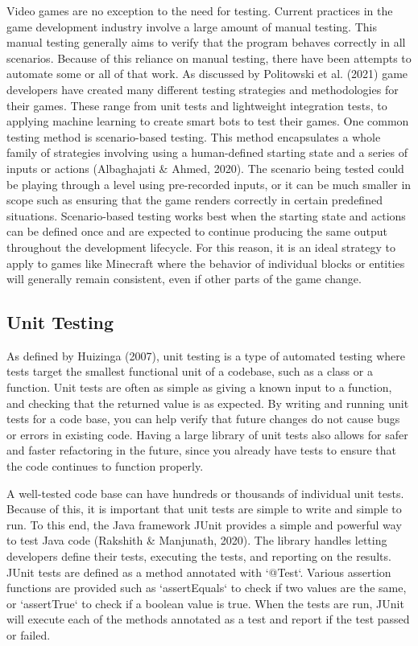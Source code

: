 \documentclass{article}
\begin{document}
\begin{onehalfspacing}
Video games are no exception to the need for testing. Current practices
in the game development industry involve a large amount of manual
testing. This manual testing generally aims to verify that the program
behaves correctly in all scenarios. Because of this reliance on manual
testing, there have been attempts to automate some or all of that work.
As discussed by Politowski et al. (2021) game developers have created
many different testing strategies and methodologies for their games.
These range from unit tests and lightweight integration tests, to
applying machine learning to create smart bots to test their games. One
common testing method is scenario-based testing. This method
encapsulates a whole family of strategies involving using a
human-defined starting state and a series of inputs or actions
(Albaghajati \& Ahmed, 2020). The scenario being tested could be playing
through a level using pre-recorded inputs, or it can be much smaller in
scope such as ensuring that the game renders correctly in certain
predefined situations. Scenario-based testing works best when the
starting state and actions can be defined once and are expected to
continue producing the same output throughout the development lifecycle.
For this reason, it is an ideal strategy to apply to games like
Minecraft where the behavior of individual blocks or entities will
generally remain consistent, even if other parts of the game change.

\subsection{Unit Testing}

As defined by Huizinga (2007), unit testing is a type of automated
testing where tests target the smallest functional unit of a codebase,
such as a class or a function. Unit tests are often as simple as giving
a known input to a function, and checking that the returned value is as
expected. By writing and running unit tests for a code base, you can
help verify that future changes do not cause bugs or errors in existing
code. Having a large library of unit tests also allows for safer and
faster refactoring in the future, since you already have tests to ensure
that the code continues to function properly.

A well-tested code base can have hundreds or thousands of individual
unit tests. Because of this, it is important that unit tests are simple
to write and simple to run. To this end, the Java framework JUnit
provides a simple and powerful way to test Java code (Rakshith \&
Manjunath, 2020). The library handles letting developers define their
tests, executing the tests, and reporting on the results. JUnit tests
are defined as a method annotated with `@Test`. Various assertion
functions are provided such as `assertEquals` to check if two values are
the same, or `assertTrue` to check if a boolean value is true. When the
tests are run, JUnit will execute each of the methods annotated as a
test and report if the test passed or failed.


\end{onehalfspacing}
\end{document}
